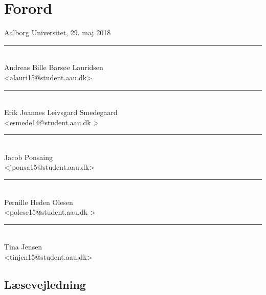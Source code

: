 \chapter*{Forord}



\vspace{\baselineskip}\hfill Aalborg Universitet, 29. maj 2018


\vspace{0.7cm}
\vfill\noindent
\begin{minipage}[b]{0.45\textwidth}
 \centering
 \rule{\textwidth}{0.5pt}\\
  Andreas Bille Barsøe Lauridsen\\
 {\footnotesize <alauri15@student.aau.dk>}
\end{minipage}
\hfill
\begin{minipage}[b]{0.45\textwidth}
 \centering
 \rule{\textwidth}{0.5pt}\\
  Erik Joannes Leivsgard Smedegaard\\
 {\footnotesize <esmede14@student.aau.dk >}
\end{minipage}
\vspace{0.7cm}
\vfill\noindent
\begin{minipage}[b]{0.45\textwidth}
 \centering
 \rule{\textwidth}{0.5pt}\\
  Jacob Ponsaing\\
 {\footnotesize <jponsa15@student.aau.dk>}
\end{minipage}
\hfill
\begin{minipage}[b]{0.45\textwidth}
 \centering
 \rule{\textwidth}{0.5pt}\\
  Pernille Heden Olesen\\
 {\footnotesize <polese15@student.aau.dk >}
\end{minipage}
\vspace{0.7cm}
\vfill\noindent
\begin{center}
\begin{minipage}[b]{0.45\textwidth}
 \centering
 \rule{\textwidth}{0.5pt}\\
  Tina Jensen\\
 {\footnotesize <tinjen15@student.aau.dk>}
\end{minipage}
\hfill
\end{center}



\clearpage

\section*{Læsevejledning}

